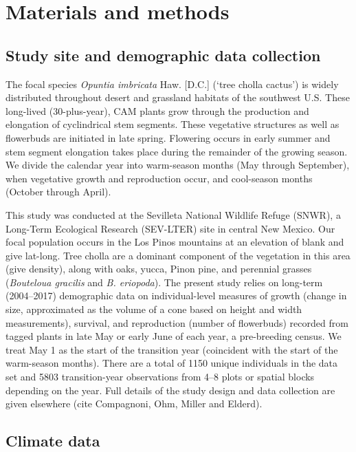 \documentclass[12pt]{article}\usepackage[]{graphicx}\usepackage[]{color}
\begin{document}
\section*{Materials and methods}


\subsection*{Study site and demographic data collection}
The focal species \textit{Opuntia imbricata} Haw. [D.C.] (`tree cholla cactus') is widely distributed throughout desert and grassland habitats of the southwest U.S.
These long-lived (30-plus-year), CAM plants grow through the production and elongation of cyclindrical stem segments. These vegetative structures as well as flowerbuds are initiated in late spring. 
Flowering occurs in early summer and stem segment elongation takes place during the remainder of the growing season. 
We divide the calendar year into warm-season months (May through September), when vegetative growth and reproduction occur, and cool-season months (October through April).

This study was conducted at the Sevilleta National Wildlife Refuge (SNWR), a Long-Term Ecological Research (SEV-LTER) site in central New Mexico. 
Our focal population occurs in the Los Pinos mountains at an elevation of blank and give lat-long. 
Tree cholla are a dominant component of the vegetation in this area (give density), along with oaks, yucca, Pinon pine, and perennial grasses (\textit{Bouteloua gracilis} and \textit{B. eriopoda}).
The present study relies on long-term (2004--2017) demographic data on individual-level measures of growth (change in size, approximated as the volume of a cone based on height and width measurements), survival, and reproduction (number of flowerbuds) recorded from tagged plants in late May or early June of each year, a pre-breeding census. 
We treat May 1 as the start of the transition year (coincident with the start of the warm-season months).
There are a total of 1150 unique individuals in the data set and 5803 transition-year observations from 4--8 plots or spatial blocks depending on the year. 
Full details of the study design and data collection are given elsewhere (cite Compagnoni, Ohm, Miller and Elderd).

\subsection*{Climate data}
\end{document}
